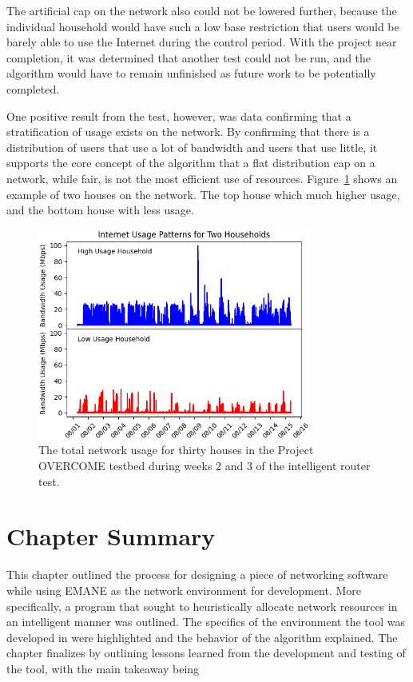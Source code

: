 The artificial cap on the network also could not be lowered further, because the individual household would have such a low base restriction that users would be barely able to use the Internet during the control period.
With the project near completion, it was determined that another test could not be run, and the algorithm would have to remain unfinished as future work to be potentially completed.\par
One positive result from the test, however, was data confirming that a stratification of usage exists on the network.
By confirming that there is a distribution of users that use a lot of bandwidth and users that use little, it supports the core concept of the algorithm that a flat distribution cap on a network, while fair, is not the most efficient use of resources. Figure~\ref{usage_compare} shows an example of two houses on the network. The top house which much higher usage, and the bottom house with less usage.
\begin{figure}[!ht]
    \centering
    \includegraphics[width=0.8\textwidth,keepaspectratio]{Images/Chpt4/Network_Compare.png}
    \caption{The total network usage for thirty houses in the Project OVERCOME testbed during weeks 2 and 3 of the intelligent router test.}
    \label{usage_compare}
\end{figure}

\section{Chapter Summary}
This chapter outlined the process for designing a piece of networking software while using EMANE as the network environment for development.
More specifically, a program that sought to heuristically allocate network resources in an intelligent manner was outlined.
The specifics of the environment the tool was developed in were highlighted and the behavior of the algorithm explained.
The chapter finalizes by outlining lessons learned from the development and testing of the tool, with the main takeaway being 